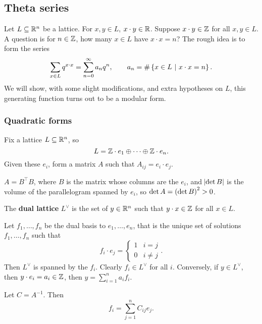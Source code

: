 \pagebreak

\subsection{Theta series}

Let $ L \subseteq \mathbb{R}^n $ be a lattice. For $ x, y \in L $, $ x \cdot y \in \mathbb{R} $. Suppose $ x \cdot y \in \mathbb{Z} $ for all $ x, y \in L $. A question is for $ n \in \mathbb{Z} $, how many $ x \in L $ have $ x \cdot x = n $? The rough idea is to form the series
$$ \sum_{x \in L} q^{x \cdot x} = \sum_{n = 0}^\infty a_nq^n, \qquad a_n = \#\cbr{x \in L \st x \cdot x = n}. $$
We will show, with some slight modifications, and extra hypotheses on $ L $, this generating function turns out to be a modular form.

\subsubsection{Quadratic forms}

Fix a lattice $ L \subseteq \mathbb{R}^n $, so
$$ L = \mathbb{Z} \cdot e_1 \oplus \dots \oplus \mathbb{Z} \cdot e_n. $$
Given these $ e_i $, form a matrix $ A $ such that $ A_{ij} = e_i \cdot e_j $.

\begin{note*}
$ A = B^\intercal B $, where $ B $ is the matrix whose columns are the $ e_i $, and $ \abs{\det B} $ is the volume of the parallelogram spanned by $ e_i $, so $ \det A = \br{\det B}^2 > 0 $.
\end{note*}

\begin{definition}
The \textbf{dual lattice} $ L^\vee $ is the set of $ y \in \mathbb{R}^n $ such that $ y \cdot x \in \mathbb{Z} $ for all $ x \in L $.
\end{definition}

Let $ f_1, \dots, f_n $ be the dual basis to $ e_1, \dots, e_n $, that is the unique set of solutions $ f_1, \dots, f_n $ such that
$$ f_i \cdot e_j =
\begin{cases}
1 & i = j \\
0 & i \ne j
\end{cases}.
$$
Then $ L^\vee $ is spanned by the $ f_i $. Clearly $ f_i \in L^\vee $ for all $ i $. Conversely, if $ y \in L^\vee $, then $ y \cdot e_i = a_i \in \mathbb{Z} $, then $ y = \sum_{i = 1}^n a_if_i $.

\begin{proposition}
Let $ C = A^{-1} $. Then
$$ f_i = \sum_{j = 1}^n C_{ij}e_j. $$
\end{proposition}

